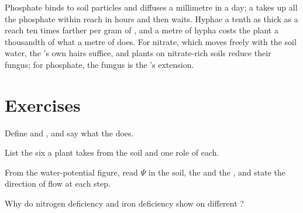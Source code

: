 \begin{example}\label{ex:b1:plant-water-minerals:phosphate}
Phosphate binds to soil particles and diffuses a millimetre in a day;
a  takes up all the phosphate within reach in hours and then
waits. Hyphae a tenth as thick as a  reach ten times farther
per gram of , and a metre of hypha costs the plant a thousandth
of what a metre of  does. For nitrate, which moves freely with the
soil water, the 's own hairs suffice, and plants on nitrate-rich
soils reduce their fungus; for phosphate, the fungus is the 's
extension.
\end{example}

\section{Exercises}

\begin{exercise}[$\star$]\label{exo:b1:plant-water-minerals:1}
Define  and , and say what the  does.
\end{exercise}

\begin{exercise}[$\star$]\label{exo:b1:plant-water-minerals:2}
List the six  a plant takes from the soil and one role
of each.
\end{exercise}

\begin{exercise}[$\star$]\label{exo:b1:plant-water-minerals:3}
From the water-potential figure, read $\Psi$ in the soil, the 
 and the  , and state the direction of flow at each step.
\end{exercise}

\begin{exercise}[$\star$]\label{exo:b1:plant-water-minerals:4}
Why do nitrogen deficiency and iron deficiency show on different
?
\end{exercise}


